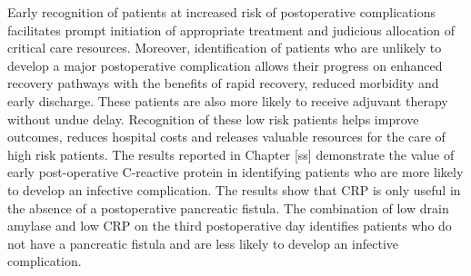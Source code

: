 Early recognition of patients at increased risk of postoperative complications facilitates prompt initiation of appropriate treatment and judicious allocation of critical care resources. 
Moreover, identification of patients who are unlikely to develop a major postoperative complication allows their progress on enhanced recovery pathways with the benefits of rapid recovery, reduced morbidity and early discharge. 
These patients are also more likely to receive adjuvant therapy without undue delay. 
Recognition of these low risk patients helps improve outcomes, reduces hospital costs and releases valuable resources for the care of high risk patients. 
The results reported in Chapter [ss] demonstrate the value of early post-operative C-reactive protein in identifying patients who are more likely to develop an infective complication. 
The results show that CRP is only useful in the absence of a postoperative pancreatic fistula. 
The combination of low drain amylase and low CRP on the third postoperative day identifies patients who do not have a pancreatic fistula and are less likely to develop an infective complication. 